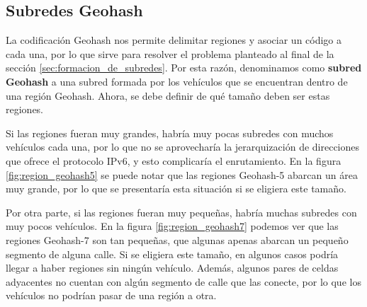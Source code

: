 
\subsection{Subredes Geohash}

\label{subsec:subredes_geohash}

La codificación Geohash nos permite delimitar regiones y asociar un código a
cada una, por lo que sirve para resolver el problema planteado al final de la
sección \ref{sec:formacion_de_subredes}. Por esta razón, denominamos como
\textbf{subred Geohash} a una subred formada por los vehículos que se encuentran
dentro de una región Geohash. Ahora, se debe definir de qué tamaño deben ser
estas regiones.

Si las regiones fueran muy grandes, habría muy pocas subredes con muchos
vehículos cada una, por lo que no se aprovecharía la jerarquización de
direcciones que ofrece el protocolo IPv6, y esto complicaría el enrutamiento.
En la figura \ref{fig:region_geohash5} se puede notar que las regiones
Geohash-5 abarcan un área muy grande, por lo que se presentaría esta situación
si se eligiera este tamaño.

Por otra parte, si las regiones fueran muy pequeñas, habría muchas subredes con
muy pocos vehículos. En la figura \ref{fig:region_geohash7} podemos ver que las
regiones Geohash-7 son tan pequeñas, que algunas apenas abarcan un pequeño
segmento de alguna calle. Si se eligiera este tamaño, en algunos casos
podría llegar a haber regiones sin ningún vehículo. Además, algunos pares de
celdas adyacentes no cuentan con algún segmento de calle que las conecte, por
lo que los vehículos no podrían pasar de una región a otra.

